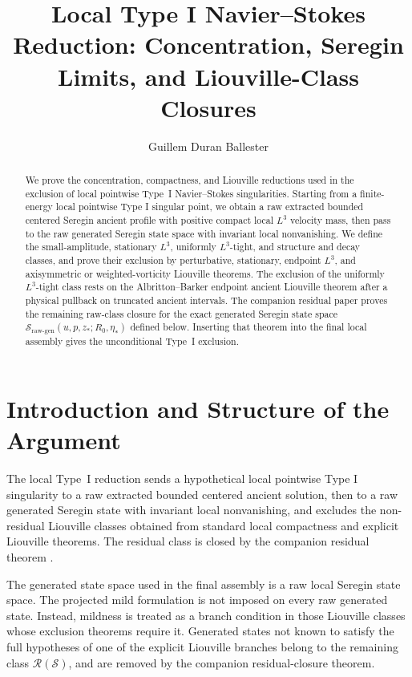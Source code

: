 \documentclass[11pt]{amsart}
\title[Local Type I Navier--Stokes Reduction]
{Local Type I Navier--Stokes Reduction: Concentration, Seregin Limits, and Liouville-Class Closures}
\author{Guillem Duran Ballester}
\date{}
\theoremstyle{plain}
\theoremstyle{definition}
\theoremstyle{remark}
\numberwithin{equation}{section}
\newcommand{\calS}{\mathcal S}
\newcommand{\calR}{\mathcal R}
\begin{document}
\begin{abstract}
We prove the concentration, compactness, and Liouville reductions used in the
exclusion of local pointwise Type~I Navier--Stokes singularities.
Starting from a finite-energy local pointwise Type I singular
point, we obtain a raw extracted bounded centered Seregin ancient profile
with positive compact local \(L^3\) velocity mass, then pass to the raw
generated Seregin state space with invariant local nonvanishing.  We define the
small-amplitude, stationary \(L^3\), uniformly \(L^3\)-tight, and
structure and decay classes, and prove their exclusion by
perturbative, stationary, endpoint \(L^3\), and axisymmetric or
weighted-vorticity Liouville theorems.  The exclusion of the uniformly
\(L^3\)-tight class
rests on the Albritton--Barker endpoint ancient Liouville theorem after a
physical pullback on truncated ancient intervals.  The companion residual
paper proves the remaining raw-class closure
 for the exact generated Seregin state space
\(\calS_{\mathrm{raw\text{-}gen}}(u,p,z_*;R_0,\eta_*)\) defined below.  Inserting
that theorem into the final local assembly gives the unconditional Type~I
exclusion.
\end{abstract}

\maketitle
\tableofcontents

\section*{Introduction and Structure of the Argument}

The local Type~I reduction sends a hypothetical local
pointwise Type I singularity to a raw extracted bounded centered ancient
solution, then to a raw generated Seregin state with invariant local
nonvanishing, and excludes the non-residual Liouville classes obtained from
standard local compactness and explicit Liouville theorems.  The residual
class is closed by the companion residual theorem
.

The generated state space used in the final assembly is a raw local Seregin
state space.  The projected mild formulation is not imposed on every raw
generated state.  Instead, mildness is treated as a branch condition in those
Liouville classes whose exclusion theorems require it.  Generated states not
known to satisfy the full hypotheses of one of the explicit Liouville branches
belong to the remaining class \(\calR(\calS)\), and are removed by the
companion residual-closure theorem.
\end{document}
